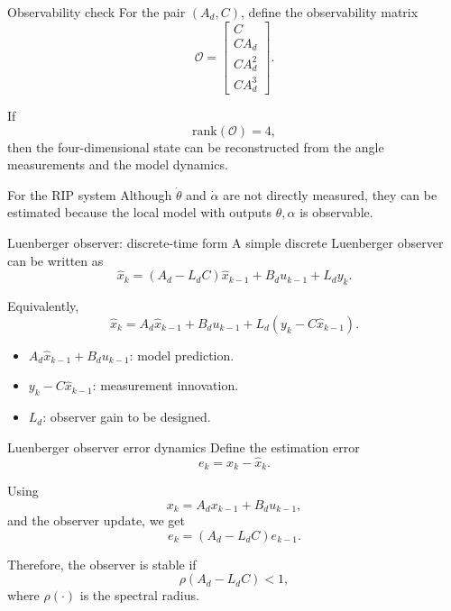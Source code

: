 \documentclass[aspectratio=169]{beamer}
\begin{document}
\begin{frame}{Observability check}
For the pair \((A_d,C)\), define the observability matrix
\[
\mathcal O=
\begin{bmatrix}
C\\
CA_d\\
CA_d^2\\
CA_d^3
\end{bmatrix}.
\]

If
\[
\mathrm{rank}(\mathcal O)=4,
\]
then the four-dimensional state can be reconstructed from the angle measurements and the model dynamics.


\begin{alertblock}{For the RIP system}
\small
Although \(\dot\theta\) and \(\dot\alpha\) are not directly measured, they can be estimated because the local model with outputs \(\theta,\alpha\) is observable.
\end{alertblock}
\end{frame}

\begin{frame}{Luenberger observer: discrete-time form}
A simple discrete Luenberger observer can be written as
\[
\hat{x}_{k}
=
(A_d-L_dC)\hat{x}_{k-1}
+B_du_{k-1}
+L_dy_k.
\]

Equivalently,
\[
\hat{x}_{k}
=
A_d\hat{x}_{k-1}+B_du_{k-1}
+L_d\left(y_k-C\hat{x}_{k-1}\right).
\]

\vspace{0.2cm}
\begin{itemize}
    \item \(A_d\hat{x}_{k-1}+B_du_{k-1}\): model prediction.
    \vspace{0.15cm}
    \item \(y_k-C\hat{x}_{k-1}\): measurement innovation.
    \vspace{0.15cm}
    \item \(L_d\): observer gain to be designed.
\end{itemize}
\end{frame}

\begin{frame}{Luenberger observer error dynamics}
Define the estimation error
\[
e_k=x_k-\hat{x}_k.
\]

Using
\[
x_k=A_dx_{k-1}+B_du_{k-1},
\]
and the observer update, we get
\[
e_k=(A_d-L_dC)e_{k-1}.
\]

\vspace{0.25cm}
Therefore, the observer is stable if
\[
\rho(A_d-L_dC)<1,
\]
where \(\rho(\cdot)\) is the spectral radius.

\end{frame}
\end{document}
